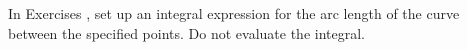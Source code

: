 {\noindent In Exercises}
{, set up an integral expression for the arc length of the curve between the specified points.  Do not evaluate the integral.
}
